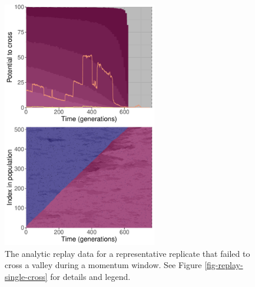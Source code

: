\begin{figure}[h!]
\begin{center}
\includegraphics[width=0.6\textwidth]{05_adaptive_momentum/media/reps/339/script_06__plot_03__combined_plot_area.pdf}
\caption{
    The analytic replay data for a representative replicate that failed to cross a valley during a momentum window.
    See Figure \ref{fig-replay-single-cross} for details and legend.
}
\label{fig-replay-no-cross}
\end{center}
\end{figure}

